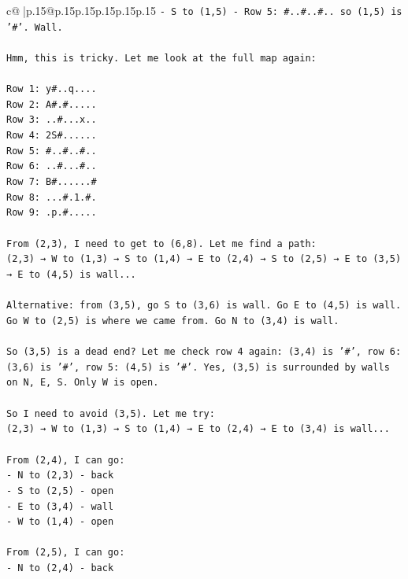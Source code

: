 \documentclass{article}
\begin{document}
{\begin{supertabular}{c@{$\;$}|p{.15\linewidth}@{}p{.15\linewidth}p{.15\linewidth}p{.15\linewidth}p{.15\linewidth}p{.15\linewidth}}
{{{\texttt{{-} S to (1,5) {-} Row 5: \#..\#..\#.. so (1,5) is '\#'. Wall.} \\
\\ 
\texttt{Hmm, this is tricky. Let me look at the full map again:} \\
\\ 
\texttt{Row 1: y\#..q....} \\
\texttt{Row 2: A\#.\#.....} \\
\texttt{Row 3: ..\#...x..} \\
\texttt{Row 4: 2S\#......} \\
\texttt{Row 5: \#..\#..\#..} \\
\texttt{Row 6: ..\#...\#..} \\
\texttt{Row 7: B\#......\#} \\
\texttt{Row 8: ...\#.1.\#.} \\
\texttt{Row 9: .p.\#.....} \\
\\ 
\texttt{From (2,3), I need to get to (6,8). Let me find a path:} \\
\texttt{(2,3) → W to (1,3) → S to (1,4) → E to (2,4) → S to (2,5) → E to (3,5) → E to (4,5) is wall...} \\
\\ 
\texttt{Alternative: from (3,5), go S to (3,6) is wall. Go E to (4,5) is wall. Go W to (2,5) is where we came from. Go N to (3,4) is wall.} \\
\\ 
\texttt{So (3,5) is a dead end? Let me check row 4 again: (3,4) is '\#', row 6: (3,6) is '\#', row 5: (4,5) is '\#'. Yes, (3,5) is surrounded by walls on N, E, S. Only W is open.} \\
\\ 
\texttt{So I need to avoid (3,5). Let me try:} \\
\texttt{(2,3) → W to (1,3) → S to (1,4) → E to (2,4) → E to (3,4) is wall...} \\
\\ 
\texttt{From (2,4), I can go:} \\
\texttt{{-} N to (2,3) {-} back} \\
\texttt{{-} S to (2,5) {-} open} \\
\texttt{{-} E to (3,4) {-} wall} \\
\texttt{{-} W to (1,4) {-} open} \\
\\ 
\texttt{From (2,5), I can go:} \\
\texttt{{-} N to (2,4) {-} back} \\
}}}
\end{supertabular}}
\end{document}
